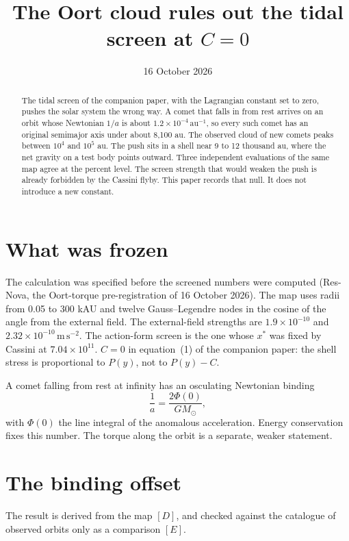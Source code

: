 \documentclass[11pt]{article}
\title{The Oort cloud rules out the tidal screen at \(C = 0\)}
\date{16 October 2026}
\begin{document}
\maketitle

\begin{abstract}
The tidal screen of the companion paper, with the Lagrangian constant set to zero, pushes the solar system the wrong way. A comet that falls in from rest arrives on an orbit whose Newtonian \(1/a\) is about \(1.2\times 10^{-4}\,\mathrm{au^{-1}}\), so every such comet has an original semimajor axis under about 8{,}100 au. The observed cloud of new comets peaks between \(10^{4}\) and \(10^{5}\) au. The push sits in a shell near 9 to 12 thousand au, where the net gravity on a test body points outward. Three independent evaluations of the same map agree at the percent level. The screen strength that would weaken the push is already forbidden by the Cassini flyby. This paper records that null. It does not introduce a new constant.
\end{abstract}

\section{What was frozen}

The calculation was specified before the screened numbers were computed (Res-Nova, the Oort-torque pre-registration of 16 October 2026). The map uses radii from 0.05 to 300 kAU and twelve Gauss--Legendre nodes in the cosine of the angle from the external field. The external-field strengths are \(1.9\times 10^{-10}\) and \(2.32\times 10^{-10}\,\mathrm{m\,s^{-2}}\). The action-form screen is the one whose \(x^*\) was fixed by Cassini at \(7.04\times 10^{11}\). \(C = 0\) in equation~(1) of the companion paper: the shell stress is proportional to \(P(y)\), not to \(P(y)-C\).

A comet falling from rest at infinity has an osculating Newtonian binding
\[
\frac{1}{a} = \frac{2\Phi(0)}{GM_\odot},
\]
with \(\Phi(0)\) the line integral of the anomalous acceleration. Energy conservation fixes this number. The torque along the orbit is a separate, weaker statement.

\section{The binding offset}

The result is derived from the map \([D]\), and checked against the catalogue of observed orbits only as a comparison \([E]\).
\end{document}

